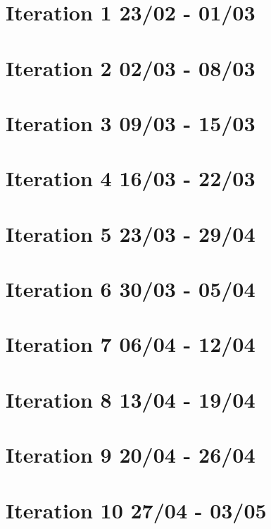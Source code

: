\section{Iteration 1 23/02 - 01/03}


\section{Iteration 2 02/03 - 08/03}


\section{Iteration 3 09/03 - 15/03}


\section{Iteration 4 16/03 - 22/03}


\section{Iteration 5 23/03 - 29/04}


\section{Iteration 6 30/03 - 05/04}


\section{Iteration 7 06/04 - 12/04}


\section{Iteration 8 13/04 - 19/04}


\section{Iteration 9 20/04 - 26/04}


\section{Iteration 10 27/04 - 03/05}

